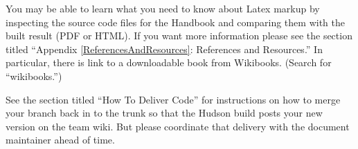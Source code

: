You may be able to learn what you need to know about
Latex markup by inspecting the source code files for the
Handbook and comparing them with the built result (PDF or
HTML).  If you want more information please see the 
section titled ``Appendix \ref{ReferencesAndResources}: References and Resources.''
In particular, there
is link to a downloadable book from Wikibooks.  (Search for
``wikibooks.'')

See the section titled ``How To Deliver Code'' for instructions on 
how to merge your branch back in to the trunk so that the
Hudson build posts your new version on the team wiki.  But
please coordinate that delivery with the document maintainer
ahead of time.



